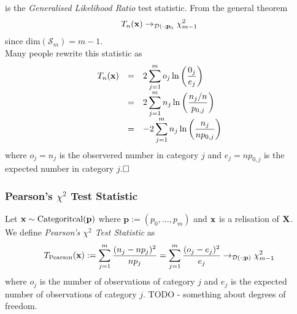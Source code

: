 \documentclass[11pt,a4paper]{article}
\begin{document}
is the \textit{Generalised Likelihood Ratio} test statistic. From the general theorem
$$T_n(\textbf{x})\to_{\mathcal{D}(\cdot;\textbf{p}_0}\chi^2_{m-1}$$
since $\text{dim}(\mathcal{S}_m)=m-1$.\\
Many people rewrite this statistic as
\[\begin{array}{rcl}
T_n(\textbf{x})&=&{\displaystyle2\sum_{j=1}^mo_j\ln\left(\frac{0_j}{e_j}\right)}\\
&=&{\displaystyle2\sum_{j=1}^mn_j\ln\left(\frac{n_j/n}{p_{0,j}}\right)}\\
&=&{\displaystyle-2\sum_{j=1}^mn_j\ln\left(\frac{n_j}{np_{0,j}}\right)}
\end{array}\]
where $o_j=n_j$ is the observered number in category $j$ and $e_j=np_{0,j}$ is the expected number in category $j$.$\hfill\square$

\subsubsection{Pearson's $\chi^2$ Test Statistic}

Let $\textbf{x}\sim\text{Categoritcal}(\textbf{p})$ where $\textbf{p}:=(p_0,\dots,p_m)$ and $\textbf{x}$ is a relisation of $\textbf{X}$.\\
We define \textit{Pearson's $\chi^2$ Test Statistic}  as
$$T_\text{Pearson}(\textbf{x}):=\sum_{j=1}^m\frac{(n_j-np_{j})^2}{np_{j}}=\sum_{j=1}^m\frac{(o_j-e_j)^2}{e_j}\to_{\mathcal{D}(\cdot;\textbf{p})}\chi^2_{m-1}$$
where $o_j$ is the number of observations of category $j$ and $e_j$ is the expected number of observations of category $j$.
\nb TODO - something about degrees of freedom.\\
\end{document}
